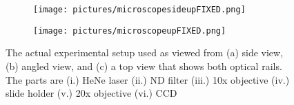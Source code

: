 \begin{figure}[ht!]
    \ContinuedFloat
    \begin{center}
        \begin{subfigure}[t]{\textwidth}
            \label{fig:OurMicroscopeSideUp}
            \texttt{[image: pictures/microscopesideupFIXED.png]}
            \caption{}
        \end{subfigure}

    \end{center}
\end{figure}



\begin{figure}[ht!]
    \ContinuedFloat
    \begin{center}

        \begin{subfigure}[t]{\textwidth}
            \label{fig:OurMicroscopeUp}
            \texttt{[image: pictures/microscopeupFIXED.png]}
            \caption{}
        \end{subfigure}

    \end{center}
    \caption{%
        The actual experimental setup used as viewed from (a) side view, (b)
        angled
        view, and (c) a top view that shows both optical rails. The parts are
            (i.) HeNe laser (ii.) ND filter (iii.) 10x objective (iv.)
                slide holder (v.) 20x objective (vi.) CCD
    }%
    \label{fig:OurMicroscope}
\end{figure}


